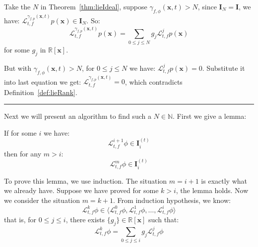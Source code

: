 \documentclass{jssc}
\newcommand{\rulex}{\hfill\rule{1mm}{3mm}}
\begin{document}
Take the $N$ in Theorem~\ref{thm:lieIdeal}, suppose $\gamma_{f, \phi}(\boldsymbol{x}, t) > N$, since $\boldsymbol{I}_N = \boldsymbol{I}$, we have:  $\mathcal{L}_{t, f}^{\gamma_{f, p}(\boldsymbol{x}, t)} p(\boldsymbol{x}) \in \boldsymbol{I}_N$. So: 
\begin{equation*}
	 \mathcal{L}_{t, f}^{\gamma_{f, p}(\boldsymbol{x}, t)} p(\boldsymbol{x}) = \sum_{0 \leq j \leq N} g_j \mathcal{L}_{t, f}^j p(\boldsymbol{x})
\end{equation*}
for some $g_j$ in $\mathbb{R}[\boldsymbol{x}]$.

But with $\gamma_{f, \phi}(\boldsymbol{x}, t) > N$, for $0 \leq j \leq N$ we have: $\mathcal{L}_{t, f}^j p(\boldsymbol{x}) = 0$. Substitute it into last equation we get:  $\mathcal{L}_{t, f}^{\gamma_{f, p}(\boldsymbol{x}, t)} = 0$, which contradicts Definition~\ref{def:lieRank}.
\rulex

Next we will present an algorithm to find such a $N \in \mathbb{N}$. First we give a lemma: 
\begin{lemma}
\label{lem:fixed}
If for some $i$ we have: 
	\begin{equation*}
		\mathcal{L}_{t, f}^{i+1} \phi \in \boldsymbol{I}_i^{(t)}
	\end{equation*}
	then for any $m>i$: 
	\begin{equation*}
		\mathcal{L}_{t, f}^{m} \phi \in \boldsymbol{I}_i^{(t)}
	\end{equation*}
\end{lemma}

\proof
To prove this lemma, we use induction. The situation $m = i+1$ is exactly what we already have. Suppose we have proved for some $k > i$, the lemma holds. Now we consider the situation $m = k+1$. From induction hypothesis, we know: 
		\begin{equation*}
			\mathcal{L}_{t, f}^k \phi \in \langle \mathcal{L}_{t, f}^0 \phi, \mathcal{L}_{t, f}^1 \phi, \dots, \mathcal{L}_{t, f}^i \phi \rangle
		\end{equation*}
that is, for $0 \leq j \leq i$, there exists $\{ g_j \} \in \mathbb{R} [\boldsymbol{x}]$ such that: 
		\begin{equation*}
			\mathcal{L}_{t, f}^k \phi = \sum_{0 \leq j \leq i} g_j \mathcal{L}_{t, f}^j \phi
		\end{equation*}
\end{document}
